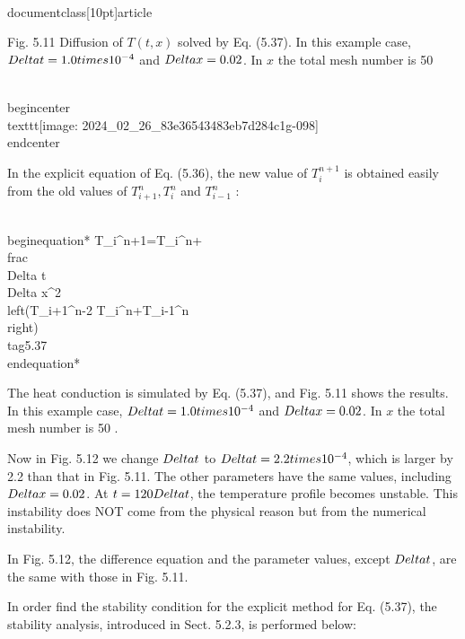 \\documentclass[10pt]{article}
\begin{document}
{Fig. 5.11 Diffusion of $T(t, x)$ solved by Eq. (5.37). In this example case, $\\Delta t=1.0 \\times 10^{-4}$ and $\\Delta x=0.02$. In $x$ the total mesh number is 50

\\begin{center}
\\texttt{[image: 2024\_02\_26\_83e36543483eb7d284c1g-098]}
\\end{center}

In the explicit equation of Eq. (5.36), the new value of $T_{i}^{n+1}$ is obtained easily from the old values of $T_{i+1}^{n}, T_{i}^{n}$ and $T_{i-1}^{n}$ :


\\begin{equation*}
T_{i}^{n+1}=T_{i}^{n}+\\frac{\\Delta t}{\\Delta x^{2}}\\left(T_{i+1}^{n}-2 T_{i}^{n}+T_{i-1}^{n}\\right) \\tag{5.37}
\\end{equation*}


The heat conduction is simulated by Eq. (5.37), and Fig. 5.11 shows the results. In this example case, $\\Delta t=1.0 \\times 10^{-4}$ and $\\Delta x=0.02$. In $x$ the total mesh number is 50 .

Now in Fig. 5.12 we change $\\Delta t$ to $\\Delta t=2.2 \\times 10^{-4}$, which is larger by 2.2 than that in Fig. 5.11. The other parameters have the same values, including $\\Delta x=0.02$. At $t=120 \\Delta t$, the temperature profile becomes unstable. This instability does NOT come from the physical reason but from the numerical instability.

In Fig. 5.12, the difference equation and the parameter values, except $\\Delta t$, are the same with those in Fig. 5.11.

In order find the stability condition for the explicit method for Eq. (5.37), the stability analysis, introduced in Sect. 5.2.3, is performed below:


}
\end{document}
